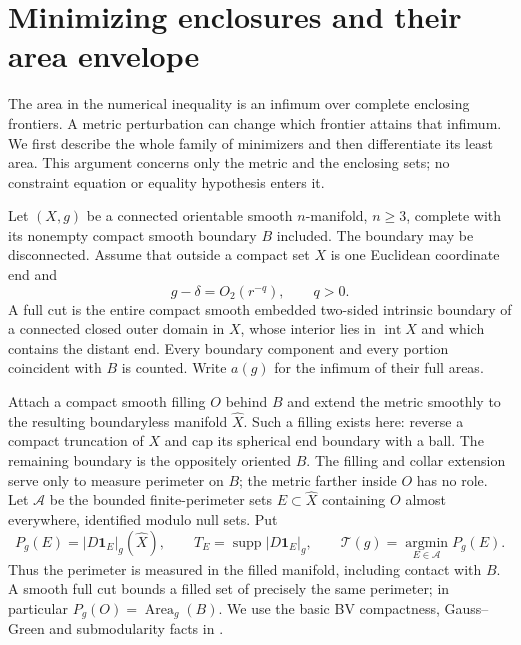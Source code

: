 \section{Minimizing enclosures and their area envelope}
\label{q:geometry:section}

The area in the numerical inequality is an infimum over complete
enclosing frontiers. A metric perturbation can change which frontier
attains that infimum. We first describe the whole family of minimizers
and then differentiate its least area. This argument concerns only the
metric and the enclosing sets; no constraint equation or equality
hypothesis enters it.

Let $(X,g)$ be a connected orientable smooth $n$-manifold, $n\ge3$,
complete with its nonempty compact smooth boundary $B$ included.
The boundary may be disconnected. Assume that outside a compact set
$X$ is one Euclidean coordinate end and
\begin{equation}\label{q:geometry:AF}
 g-\delta=O_2(r^{-q}),\qquad q>0.
\end{equation}
A full cut is the entire compact smooth embedded two-sided intrinsic
boundary of a connected closed outer domain in $X$, whose interior
lies in $\operatorname{int}X$ and which contains the distant end.
Every boundary component and every portion coincident with $B$ is
counted. Write $a(g)$ for the infimum of their full areas.

Attach a compact smooth filling $O$ behind $B$ and extend the metric
smoothly to the resulting boundaryless manifold $\widehat X$. Such a
filling exists here: reverse a compact truncation of $X$ and cap its
spherical end boundary with a ball. The remaining boundary is the
oppositely oriented $B$. The filling and collar extension serve only
to measure perimeter on $B$; the metric farther inside $O$ has no role.
Let $\mathcal A$ be the bounded finite-perimeter sets $E\subset\widehat X$
containing $O$ almost everywhere, identified modulo null sets. Put
\begin{equation}\label{q:geometry:full-perimeter}
 P_g(E)=|D\mathbf1_E|_g(\widehat X),\qquad
 T_E=\operatorname{supp}|D\mathbf1_E|_g,
 \qquad \mathcal T(g)=\operatorname*{argmin}_{E\in\mathcal A}P_g(E).
\end{equation}
Thus the perimeter is measured in the filled manifold, including
contact with $B$. A smooth full cut bounds a filled set of precisely
the same perimeter; in particular $P_g(O)=\operatorname{Area}_g(B)$.
We use the basic BV compactness, Gauss--Green and submodularity facts
in \cite{AmbrosioFuscoPallara2000,Maggi2012}.

